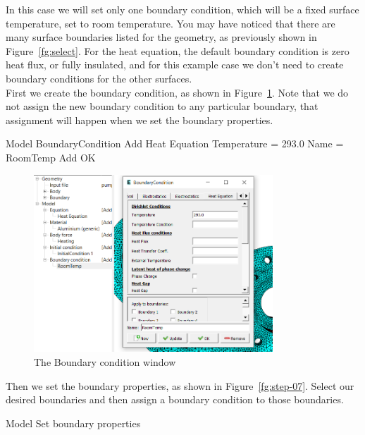In this case we will set only one boundary condition, which will be a fixed surface temperature, set to room temperature.  You may have noticed that there are many surface boundaries listed for the geometry, as previously shown in Figure~\ref{fg:select}.  For the heat equation, the default boundary condition is zero heat flux, or fully insulated, and for this example case we don't need to create boundary conditions for the other surfaces.\\

First we create the boundary condition, as shown in Figure~\ref{fg:step-06}.  Note that we do not assign the new boundary condition to any particular boundary, that assignment will happen when we set the boundary properties.

\ttbegin
Model
  BoundaryCondition
    Add 
      Heat Equation
        Temperature = 293.0
      Name = RoomTemp
      Add
      OK
\ttend   

\begin{figure}[H]
\begin{center}
\includegraphics[width=0.8\textwidth]{step-06}
\caption{The Boundary condition window}\label{fg:step-06}
\end{center}
\end{figure}

Then we set the boundary properties, as shown in Figure~\ref{fg:step-07}.  Select our desired boundaries and then assign a boundary condition to those boundaries.

\ttbegin
Model 
  Set boundary properties  
\ttend

